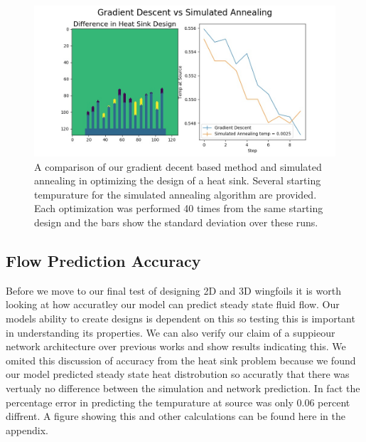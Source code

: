 \documentclass{article} %
\begin{document}
\begin{figure}[h]
\begin{center}
\includegraphics[scale=0.27]{../test/figs/heat_learn_comparison.jpeg}
\end{center}
\caption{A comparison of our gradient decent based method and simulated annealing in optimizing the design of a heat sink. Several starting tempurature for the simulated annealing algorithm are provided. Each optimization was performed 40 times from the same starting design and the bars show the standard deviation over these runs.}
\end{figure}


\subsection{Flow Prediction Accuracy}

Before we move to our final test of designing 2D and 3D wingfoils it is worth looking at how accuratley our model can predict steady state fluid flow. Our models ability to create designs is dependent on this so testing this is important in understanding its properties. We can also verify our claim of a suppieour network architecture over previous works and show results indicating this. We omited this discussion of accuracy from the heat sink problem because we found our model predicted steady state heat distrobution so accuratly that there was vertualy no difference between the simulation and network prediction. In fact the percentage error in predicting the tempurature at source was only 0.06 percent diffrent. A figure showing this and other calculations can be found here in the appendix.
\end{document}
